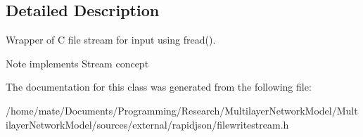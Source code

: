 \subsection{Detailed Description}
Wrapper of C file stream for input using fread(). 

\begin{DoxyNote}{Note}
implements Stream concept 
\end{DoxyNote}


The documentation for this class was generated from the following file\+:\begin{DoxyCompactItemize}
\item 
/home/mate/\+Documents/\+Programming/\+Research/\+Multilayer\+Network\+Model/\+Multilayer\+Network\+Model/sources/external/rapidjson/filewritestream.\+h\end{DoxyCompactItemize}

